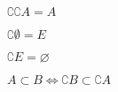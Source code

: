 \begin{proposition}
$\complement{\complement{A}} = A$
\end{proposition}

\begin{proposition}
$\complement{\emptyset} = E$
\end{proposition}

\begin{proposition}
$\complement{E} = \varnothing$
\end{proposition}

\begin{proposition}
$A \subset B \iff \complement{B} \subset \complement{A}$
\end{proposition}
